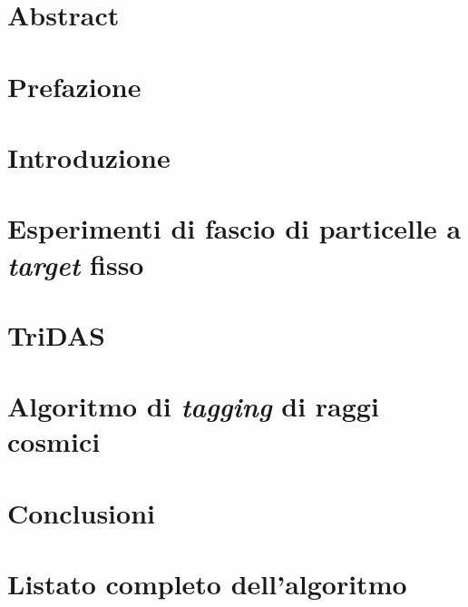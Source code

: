 \documentclass[12pt, a4paper, twoside]{report}
\begin{document}
\begin{titlepage}
    
\end{titlepage}
\setcounter{page}{1}
\chapter*{Abstract}

\chapter*{Prefazione}

\tableofcontents{}
\newpage
\chapter*{Introduzione}

\chapter{Esperimenti di fascio di particelle a \emph{target} fisso}

\chapter{TriDAS}

\chapter{Algoritmo di \emph{tagging} di raggi cosmici}

\chapter*{Conclusioni}

\appendix
\chapter{Listato completo dell'algoritmo}

\nocite{*}
\printbibliography
{}
\end{document}
